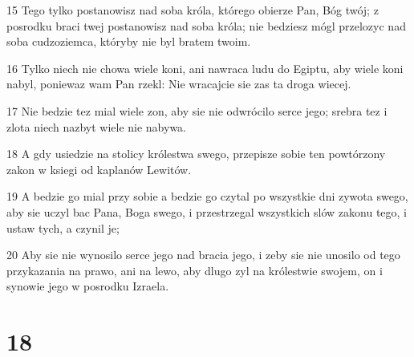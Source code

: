\par 15 Tego tylko postanowisz nad soba króla, którego obierze Pan, Bóg twój; z posrodku braci twej postanowisz nad soba króla; nie bedziesz mógl przelozyc nad soba cudzoziemca, któryby nie byl bratem twoim.
\par 16 Tylko niech nie chowa wiele koni, ani nawraca ludu do Egiptu, aby wiele koni nabyl, poniewaz wam Pan rzekl: Nie wracajcie sie zas ta droga wiecej.
\par 17 Nie bedzie tez mial wiele zon, aby sie nie odwrócilo serce jego; srebra tez i zlota niech nazbyt wiele nie nabywa.
\par 18 A gdy usiedzie na stolicy królestwa swego, przepisze sobie ten powtórzony zakon w ksiegi od kaplanów Lewitów.
\par 19 A bedzie go mial przy sobie a bedzie go czytal po wszystkie dni zywota swego, aby sie uczyl bac Pana, Boga swego, i przestrzegal wszystkich slów zakonu tego, i ustaw tych, a czynil je;
\par 20 Aby sie nie wynosilo serce jego nad bracia jego, i zeby sie nie unosilo od tego przykazania na prawo, ani na lewo, aby dlugo zyl na królestwie swojem, on i synowie jego w posrodku Izraela.

\chapter{18}


